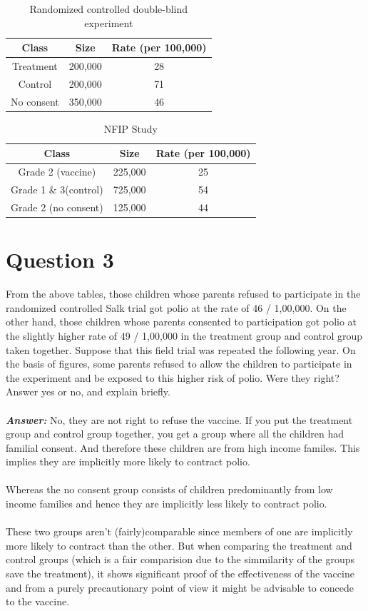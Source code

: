 \documentclass{article}
\begin{document}
\begin{table}[h]
  \centering
  \begin{tabular}{|c|c|c|}
  \hline
  \textbf{Class}&\textbf{Size}&\textbf{Rate (per 100,000)}\\
  \hline
  Treatment&200,000&28\\
  Control&200,000&71\\
  No consent&350,000&46\\
  \hline
  \end{tabular}
  \caption{Randomized controlled double-blind experiment}
\end{table}

\begin{table}[h]
  \centering
  \begin{tabular}{|c|c|c|}
  \hline
  \textbf{Class}&\textbf{Size}&\textbf{Rate (per 100,000)}\\
  \hline
  Grade 2 (vaccine)&225,000&25\\
Grade 1 \& 3(control)&725,000&54\\
Grade 2 (no consent)&125,000&44\\
  \hline
  \end{tabular}
  \caption{NFIP Study}
\end{table}

\section{Question 3}
From the above tables, those children whose parents refused to participate in the randomized controlled Salk trial got polio at the rate of 46 / 1,00,000. On the other hand, those children whose parents consented to participation got polio at the slightly higher rate of 49 / 1,00,000 in the treatment group and control group taken together. Suppose that this field trial was repeated the following year. On the basis of figures, some parents refused to allow the children to participate in the experiment and be exposed to this higher risk of polio. Were they right? Answer yes or no, and explain briefly.
\\
\\
\textit{\textbf{Answer: }} No, they are not right to refuse the vaccine. If you put the treatment group and control group together, you get a group where all the children had familial consent. And therefore these children are from high income familes. This implies they are implicitly more likely to contract polio.\\\\
Whereas the no consent group consists of children predominantly from low income families and hence they are implicitly less likely to contract polio.
\\\\
These two groups aren't (fairly)comparable since members of one are implicitly more likely to contract than the other. But when comparing the treatment and control groups (which is a fair comparision due to the simmilarity of the groups save the treatment), it shows significant proof of the effectiveness of the vaccine and from a purely precautionary point of view it might be advisable to concede to the vaccine.
\end{document}
